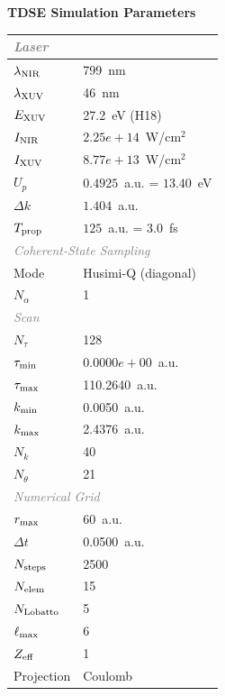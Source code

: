 \documentclass[11pt]{article}
\begin{document}

\begin{center}
  \Large\textbf{TDSE Simulation Parameters}
\end{center}
\vspace{4pt}

\begin{tabular}{@{}ll@{}}
  \toprule
  \multicolumn{2}{l}{\small\textit{\textcolor{gray}{Laser}}} \\
  \hline
  $\lambda_{\rm NIR}$ & 799~nm \\
  $\lambda_{\rm XUV}$ & 46~nm \\
  $E_{\rm XUV}$ & 27.2~eV (H18) \\
  $I_{\rm NIR}$ & $2.25e+14$~W/cm$^2$ \\
  $I_{\rm XUV}$ & $8.77e+13$~W/cm$^2$ \\
  $U_p$ & $0.4925$~a.u. = $13.40$~eV \\
  $\Delta k$ & $1.404$~a.u. \\
  $T_{\rm prop}$ & $125$~a.u. = $3.0$~fs \\
  \multicolumn{2}{l}{\small\textit{\textcolor{gray}{Coherent-State Sampling}}} \\
  \hline
  Mode & Husimi-Q (diagonal) \\
  $N_{\alpha}$ & 1 \\
  \multicolumn{2}{l}{\small\textit{\textcolor{gray}{Scan}}} \\
  \hline
  $N_{\tau}$ & 128 \\
  $\tau_{\rm min}$ & $0.0000e+00$~a.u. \\
  $\tau_{\rm max}$ & 110.2640~a.u. \\
  $k_{\rm min}$ & 0.0050~a.u. \\
  $k_{\rm max}$ & 2.4376~a.u. \\
  $N_k$ & 40 \\
  $N_{\theta}$ & 21 \\
  \multicolumn{2}{l}{\small\textit{\textcolor{gray}{Numerical Grid}}} \\
  \hline
  $r_{\rm max}$ & 60~a.u. \\
  $\Delta t$ & 0.0500~a.u. \\
  $N_{\rm steps}$ & 2500 \\
  $N_{\rm elem}$ & 15 \\
  $N_{\rm Lobatto}$ & 5 \\
  $\ell_{\rm max}$ & 6 \\
  $Z_{\rm eff}$ & 1 \\
  Projection & Coulomb \\
  \bottomrule
\end{tabular}
\end{document}
